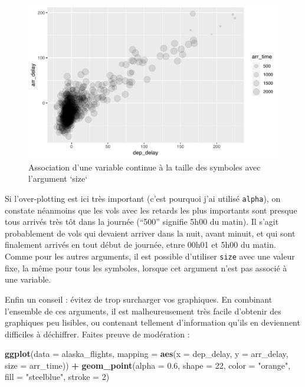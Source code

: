\documentclass[a4paperpaper,]{article}
\newenvironment{Shaded}{\begin{snugshade}}{\end{snugshade}}
\newcommand{\KeywordTok}[1]{\textcolor[rgb]{0.13,0.29,0.53}{\textbf{#1}}}
\newcommand{\DataTypeTok}[1]{\textcolor[rgb]{0.13,0.29,0.53}{#1}}
\newcommand{\DecValTok}[1]{\textcolor[rgb]{0.00,0.00,0.81}{#1}}
\newcommand{\FloatTok}[1]{\textcolor[rgb]{0.00,0.00,0.81}{#1}}
\newcommand{\StringTok}[1]{\textcolor[rgb]{0.31,0.60,0.02}{#1}}
\newcommand{\OperatorTok}[1]{\textcolor[rgb]{0.81,0.36,0.00}{\textbf{#1}}}
\newcommand{\NormalTok}[1]{#1}
\theoremstyle{definition}
\theoremstyle{definition}
\theoremstyle{definition}
\theoremstyle{remark}
\begin{document}
\begin{figure}[htpb]

{\centering \includegraphics[width=0.9\linewidth]{figure/sizeplot-1} 

}

\caption{Association d'une variable continue à la taille des symboles avec l'argument `size`}\label{fig:sizeplot}
\end{figure}

Si l'over-plotting est ici très important (c'est pourquoi j'ai utilisé
\texttt{alpha}), on constate néanmoins que les vols avec les retards les
plus importants sont presque tous arrivés très tôt dans la journée
(``500'' signifie 5h00 du matin). Il s'agit probablement de vols qui
devaient arriver dans la nuit, avant minuit, et qui sont finalement
arrivés en tout début de journée, etnre 00h01 et 5h00 du matin. Comme
pour les autres arguments, il est possible d'utiliser \texttt{size} avec
une valeur fixe, la même pour tous les symboles, lorsque cet argument
n'est pas associé à une variable.

Enfin un conseil : évitez de trop surcharger vos graphiques. En
combinant l'ensemble de ces arguments, il est malheureusement très
facile d'obtenir des graphiques peu lisibles, ou contenant tellement
d'information qu'ils en deviennent difficiles à déchiffrer. Faites
preuve de modération :

\begin{Shaded}
\begin{Highlighting}[]
\KeywordTok{ggplot}\NormalTok{(}\DataTypeTok{data =}\NormalTok{ alaska_flights, }\DataTypeTok{mapping =} \KeywordTok{aes}\NormalTok{(}\DataTypeTok{x =}\NormalTok{ dep_delay, }\DataTypeTok{y =}\NormalTok{ arr_delay, }\DataTypeTok{size =}\NormalTok{ arr_time)) }\OperatorTok{+}
\StringTok{  }\KeywordTok{geom_point}\NormalTok{(}\DataTypeTok{alpha =} \FloatTok{0.6}\NormalTok{, }
             \DataTypeTok{shape =} \DecValTok{22}\NormalTok{,}
             \DataTypeTok{color =} \StringTok{"orange"}\NormalTok{,}
             \DataTypeTok{fill =} \StringTok{"steelblue"}\NormalTok{,}
             \DataTypeTok{stroke =} \DecValTok{2}\NormalTok{)}
\end{Highlighting}
\end{Shaded}
\end{document}
